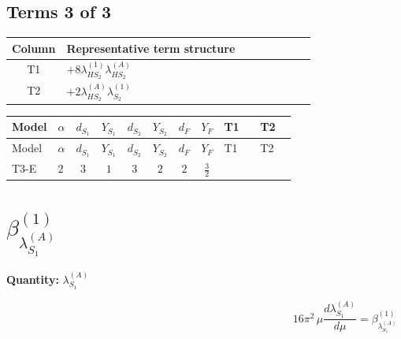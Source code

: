 \documentclass[8pt]{article}
\begin{document}
\begin{landscape}
\subsection*{Terms 3 of 3}
\begin{center}
\begin{tabular}{@{}c >{\raggedright\arraybackslash}p{0.82\linewidth}@{}}
\toprule
Column & Representative term structure \\
\midrule
T1 & \(\displaystyle +8 {\lambda_{HS_2}^{(1)}} {\lambda_{HS_2}^{(A)}}\) \\
\midrule
T2 & \(\displaystyle +2 {\lambda_{HS_2}^{(A)}} {\lambda_{S_2}^{(1)}}\) \\
\midrule
\bottomrule
\end{tabular}
\end{center}
\smallskip
\tiny
\begin{longtable}{@{}llcccccc >{\raggedright\arraybackslash}p{0.21\linewidth} >{\raggedright\arraybackslash}p{0.21\linewidth}@{}}
\toprule
Model & $\alpha$ & $d_{S_1}$ & $Y_{S_1}$ & $d_{S_2}$ & $Y_{S_2}$ & $d_F$ & $Y_F$ & T1 & T2 \\
\midrule
\endfirsthead
\toprule
Model & $\alpha$ & $d_{S_1}$ & $Y_{S_1}$ & $d_{S_2}$ & $Y_{S_2}$ & $d_F$ & $Y_F$ & T1 & T2 \\
\midrule
\endhead
T3-E & $2$ & $3$ & $1$ & $3$ & $2$ & $2$ & $\frac{3}{2}$ & \scriptsize\adjustbox{max width=\linewidth}{$\begin{gathered} +8 {\lambda_{HS_2}^{(1)}} {\lambda_{HS_2}^{(A)}}\end{gathered}$} & \scriptsize\adjustbox{max width=\linewidth}{$\begin{gathered} +2 {\lambda_{HS_2}^{(A)}} {\lambda_{S_2}^{(1)}}\end{gathered}$} \\
\midrule
\bottomrule
\end{longtable}
\clearpage
\section*{$\beta_{\lambda_{S_1}^{(A)}}^{(1)}$}
\noindent\textbf{Quantity: }$\lambda_{S_1}^{(A)}$\par\smallskip
\[16\pi^2\,\mu\frac{d \lambda_{S_1}^{(A)}}{d\mu}=\beta_{\lambda_{S_1}^{(A)}}^{(1)}\]

\end{landscape}
\end{document}
